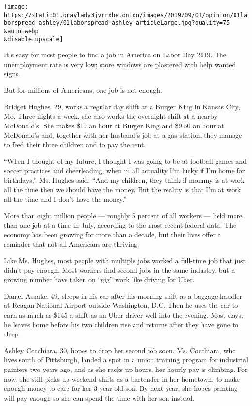 \texttt{[image: https://static01.graylady3jvrrxbe.onion/images/2019/09/01/opinion/01laborspread-ashley/01laborspread-ashley-articleLarge.jpg?quality=75\\\&auto=webp\\\&disable=upscale]}

It's easy for most people to find a job in America on Labor Day 2019.
The unemployment rate is very low; store windows are plastered with help
wanted signs.

But for millions of Americans, one job is not enough.

Bridget Hughes, 29, works a regular day shift at a Burger King in Kansas
City, Mo. Three nights a week, she also works the overnight shift at a
nearby McDonald's. She makes \$10 an hour at Burger King and \$9.50 an
hour at McDonald's and, together with her husband's job at a gas
station, they manage to feed their three children and to pay the rent.

``When I thought of my future, I thought I was going to be at football
games and soccer practices and cheerleading, when in all actuality I'm
lucky if I'm home for birthdays,'' Ms. Hughes said. ``And my children,
they think if mommy is at work all the time then we should have the
money. But the reality is that I'm at work all the time and I don't have
the money.''

More than eight million people --- roughly 5 percent of all workers ---
held more than one job at a time in July, according to the most recent
federal data. The economy has been growing for more than a decade, but
their lives offer a reminder that not all Americans are thriving.

Like Ms. Hughes, most people with multiple jobs worked a full-time job
that just didn't pay enough. Most workers find second jobs in the same
industry, but a growing number have taken on ``gig'' work like driving
for Uber.

Daniel Asnake, 49, sleeps in his car after his morning shift as a
baggage handler at Reagan National Airport outside Washington, D.C. Then
he uses the car to earn as much as \$145 a shift as an Uber driver well
into the evening. Most days, he leaves home before his two children rise
and returns after they have gone to sleep.

Ashley Cocchiara, 30, hopes to drop her second job soon. Ms. Cocchiara,
who lives south of Pittsburgh, landed a spot in a union training program
for industrial painters two years ago, and as she racks up hours, her
hourly pay is climbing. For now, she still picks up weekend shifts as a
bartender in her hometown, to make enough money to care for her
3-year-old son. By next year, she hopes painting will pay enough so she
can spend the time with her son instead.

